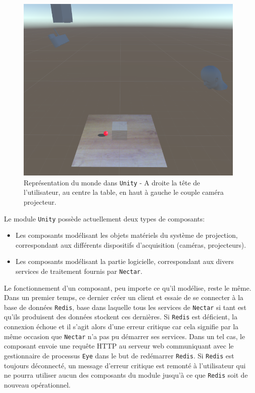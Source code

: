 \begin{figure}[ht]
\centering
\includegraphics[width=0.65\linewidth]{images/unityscene}
\caption{Représentation du monde dans \texttt{Unity} - A droite la tête de l'utilisateur, au centre la table, en haut à gauche le couple caméra projecteur.}
\label{fig:unityrealworld}
\end{figure}

Le module \texttt{Unity} possède actuellement deux types de composants:
\begin{itemize}
\item Les composants modélisant les objets matériels du système de projection, correspondant aux différents dispositifs d'acquisition (caméras, projecteurs).
\item Les composants modélisant la partie logicielle, correspondant aux divers services de traitement fournis par \texttt{Nectar}.
\end{itemize}

Le fonctionnement d'un composant, peu importe ce qu'il modélise, reste le même. Dans un premier temps, ce dernier créer un client et essaie de se connecter à la base de données \texttt{Redis}, base dans laquelle tous les services de \texttt{Nectar} si tant est qu'ils produisent des données stockent ces dernières. Si \texttt{Redis} est déficient, la connexion échoue et il s'agit alors d'une erreur critique car cela signifie par la même occasion que \texttt{Nectar} n'a pas pu démarrer ses services. Dans un tel cas, le composant envoie une requête HTTP au serveur web communiquant avec le gestionnaire de processus \texttt{Eye} dans le but de redémarrer \texttt{Redis}. Si \texttt{Redis} est toujours déconnecté, un message d'erreur critique est remonté à l'utilisateur qui ne pourra utiliser aucun des composants du module jusqu'à ce que \texttt{Redis} soit de nouveau opérationnel. 

